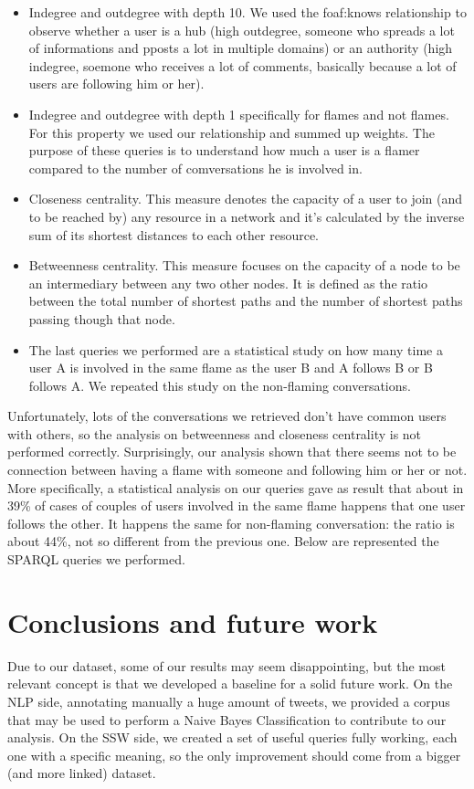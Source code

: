 \documentclass[a4paper,10pt, english]{report}
\begin{document}
\begin{itemize}
 \item Indegree and outdegree with depth 10. We used the foaf:knows relationship to observe whether a user is a hub (high outdegree, someone who spreads a lot of informations and pposts a lot in multiple domains) or an authority (high indegree, soemone who receives a lot of comments, basically because a lot of users are following him or her).
 \item Indegree and outdegree with depth 1 specifically for flames and not flames. For this property we used our relationship and summed up weights. The purpose of these queries is to understand how much a user is a flamer compared to the number of comversations he is involved in.
 \item Closeness centrality. This measure denotes the capacity of a user to join (and to be reached by) any resource in a network and it's calculated by the inverse sum of its shortest distances to each other resource.
 \item Betweenness centrality. This measure focuses on the capacity of a node to be an intermediary between any two other nodes. It is defined as the ratio between the total number of shortest paths and the number of shortest paths passing though that node.
 \item The last queries we performed are a statistical study on how many time a user A is involved in the same flame as the user B and A follows B or B follows A. We repeated this study on the non-flaming conversations.
 \end{itemize}
Unfortunately, lots of the conversations we retrieved don't have common users with others, so the analysis on betweenness and closeness centrality is not performed correctly.
Surprisingly, our analysis shown that there seems not to be connection between having a flame with someone and following him or her or not.
More specifically, a statistical analysis on our queries gave as result that about in 39\% of cases of couples of users involved in the same flame happens that one user follows the other.
It happens the same for non-flaming conversation: the ratio is about 44\%, not so different from the previous one.
Below are represented the SPARQL queries we performed.

\section{Conclusions and future work}
Due to our dataset, some of our results may seem disappointing, but the most relevant concept is that we developed a baseline for a solid future work.
On the NLP side, annotating manually a huge amount of tweets, we provided a corpus that may be used to perform a Naive Bayes Classification to contribute to our analysis.
On the SSW side, we created a set of useful queries fully working, each one with a specific meaning, so the only improvement should come from a bigger (and more linked) dataset.
\end{document}
